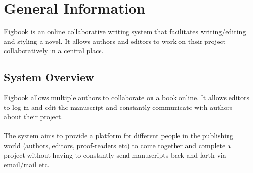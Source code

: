 \section{General Information}
\par{Figbook is an online collaborative writing system that facilitates writing/editing and styling a novel. It allows authors and editors to work on their project collaboratively in a central place.}

\subsection{System Overview}
\par{Figbook allows multiple authors to collaborate on a book online. It allows editors to log in and edit the manuscript and constantly communicate with authors about their project. \\ \\The system aims to provide a platform for different people in the publishing world (authors, editors, proof-readers etc) to come together and complete a project without having to constantly send manuscripts back and forth via email/mail etc.}
